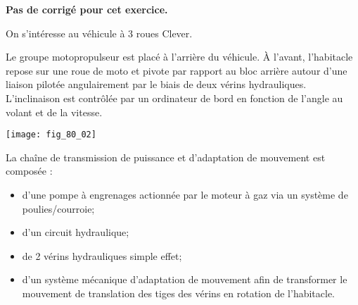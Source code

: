 \normaltrue \difficilefalse \tdifficilefalse
\correctionfalse

\setcounter{numques}{0}
\ifcorrection
\else
\textbf{Pas de corrigé pour cet exercice.}
\fi




On s'intéresse au véhicule à 3 roues Clever.

\ifprof
\else


 Le groupe motopropulseur est placé à l'arrière du véhicule. À l’avant, l’habitacle repose sur une roue de moto et pivote par rapport au bloc arrière autour d’une liaison pilotée angulairement par le biais de deux vérins hydrauliques. L'inclinaison est contrôlée par un ordinateur de bord en fonction de l'angle au volant et de la vitesse. 

\begin{center}
\texttt{[image: fig\_80\_02]}
\end{center}


La chaîne de transmission de puissance et d’adaptation de mouvement est composée :
\begin{itemize}
\item d’une pompe à engrenages actionnée par le moteur à gaz via un système de poulies/courroie;
\item d’un circuit hydraulique;
\item de 2 vérins hydrauliques simple effet;
\item d’un système mécanique d’adaptation de mouvement afin de transformer le mouvement de translation des tiges des vérins en rotation de l’habitacle.
\end{itemize}


